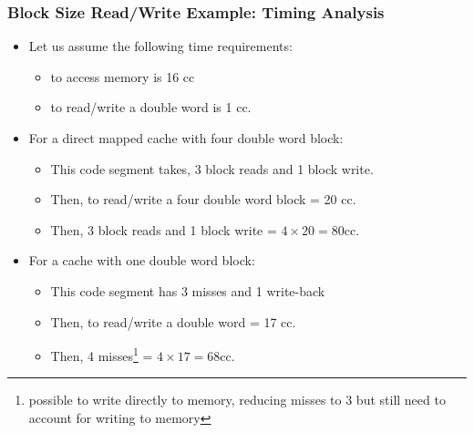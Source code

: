 \begin{frame}\frametitle{Block Size Read/Write Example: Timing Analysis}

\begin{itemize}
\item Let us assume the following time requirements: 
\begin{itemize}
    \item to access memory is 16 cc 
    \item to read/write a double word is 1 cc.
\end{itemize}
\end{itemize}
\begin{itemize}
    \item For a direct mapped cache with four double word block:
    \begin{itemize}
    \item This code segment takes, 3 block reads and 1 block write. 
    \item Then, to read/write a four double word block = 20 cc. 
    \item Then, 3 block reads and 1 block write = $4 \times 20 = 80$cc.
\end{itemize}
\item For a cache with one double word block:
\begin{itemize}
    \item This code segment has 3 misses and 1 write-back 
    \item Then, to read/write a double word = 17 cc. 
    \item Then, 4 misses\footnote{possible to write directly to memory, reducing misses to 3 but still need to account for writing to memory} = $4 \times 17 = 68$cc.
\end{itemize}
\end{itemize}


\end{frame}



